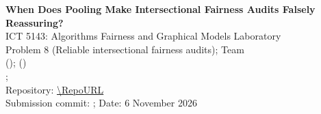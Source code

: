 \documentclass[11pt,a4paper]{article}
\newcommand{\ProjectTitle}{When Does Pooling Make Intersectional Fairness Audits Falsely Reassuring?}
\begin{document}
\sloppy
\begin{center}
{\Large\bfseries \ProjectTitle}\\[4pt]
ICT 5143: Algorithms Fairness and Graphical Models Laboratory\\
Problem 8 (Reliable intersectional fairness audits); Team \TeamID\\
\StudentA{} (\RollA); \StudentB{} (\RollB)\\
{\small \texttt{\EmailA}; \texttt{\EmailB}\\
Repository: \url{\RepoURL}\\
Submission commit: \texttt{\SubmitCommit}; Date: 6 November 2026}
\end{center}
\begin{abstract}
We ask when Bayesian pooling makes an intersectional equal-opportunity audit report ``gap $\le0.10$'' for an
outreach rule that is unfair. A discrete Bayesian network ranks ACSPublicCoverage adults (California 2018), and the
audits estimate race$\times$sex$\times$disability TPRs. Pooled audits hid isolated small-group deficits, and all 116
California and 27 Texas validation-time tolerance claims failed on test. Calibrating the audit on the target
population's group sizes and certifying on held-out households raised the audit score on fresh Texas simulations by
$+0.279$ (95\% CI $[0.235,0.322]$). Limitation: on California it only ties the best pooled audit.
\end{abstract}
\end{document}
